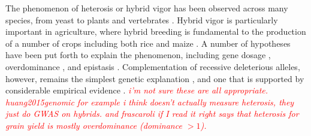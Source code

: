 \documentclass[twoside,twocolumn, letterpaper]{article}
\newcommand{\jri}[1]{\textcolor{red}{\emph{ #1}}}
\begin{document}
The phenomenon of heterosis or hybrid vigor has been observed across many species, from yeast \cite[]{Shapira2014} to plants \cite[]{shull1908composition} and vertebrates \cite[]{Gama2013}. 
Hybrid vigor is particularly important in agriculture, where hybrid breeding is fundamental to the production of a number of crops including both rice \citex and maize \citex .
A number of hypotheses have been put forth to explain the phenomenon, including gene dosage \cite[]{birchler2003search}, overdominance \cite[]{east1936heterosis, schwartz1973single, krieger2010flowering}, 
and epistasis \cite[]{minvielle1987dominance, schnell1992multiplicative}. 
Complementation of recessive deleterious alleles, however, remains the simplest genetic explanation \cite[]{Charlesworth2009}, and one that is supported by considerable empirical evidence \citex \cite[]{xiao1995dominance, frascaroli2007classical}.
\jri{i'm not sure these are all appropriate. huang2015genomic for example i think doesn't actually measure heterosis, they just do GWAS on hybrids. and frascaroli if I read it right says that heterosis for grain yield is mostly overdominance (dominance $>1$).}




\end{document}
